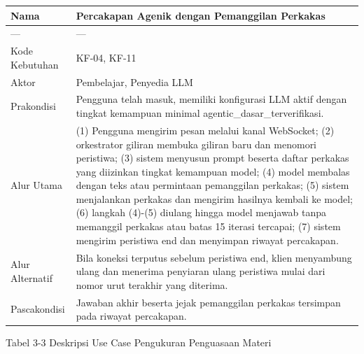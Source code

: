 \documentclass[12pt,a4paper]{article}
\begin{document}
\begin{table}[h]

\centering

\begin{tabular}{ll}

\toprule

Nama & Percakapan Agenik dengan Pemanggilan Perkakas \\

\midrule

--- & --- \\

Kode Kebutuhan & KF-04, KF-11 \\

Aktor & Pembelajar, Penyedia LLM \\

Prakondisi & Pengguna telah masuk, memiliki konfigurasi LLM aktif dengan tingkat kemampuan minimal agentic\_dasar\_terverifikasi. \\

Alur Utama & (1) Pengguna mengirim pesan melalui kanal WebSocket; (2) orkestrator giliran membuka giliran baru dan menomori peristiwa; (3) sistem menyusun prompt beserta daftar perkakas yang diizinkan tingkat kemampuan model; (4) model membalas dengan teks atau permintaan pemanggilan perkakas; (5) sistem menjalankan perkakas dan mengirim hasilnya kembali ke model; (6) langkah (4)-(5) diulang hingga model menjawab tanpa memanggil perkakas atau batas 15 iterasi tercapai; (7) sistem mengirim peristiwa end dan menyimpan riwayat percakapan. \\

Alur Alternatif & Bila koneksi terputus sebelum peristiwa end, klien menyambung ulang dan menerima penyiaran ulang peristiwa mulai dari nomor urut terakhir yang diterima. \\

Pascakondisi & Jawaban akhir beserta jejak pemanggilan perkakas tersimpan pada riwayat percakapan. \\

\bottomrule

\end{tabular}

\end{table}

Tabel 3-3	Deskripsi Use Case Pengukuran Penguasaan Materi
\end{document}
